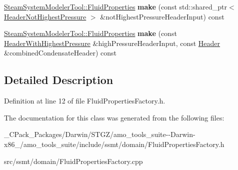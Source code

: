 \begin{DoxyCompactItemize}
\item 
\mbox{\label{class_fluid_properties_factory_a5eab55f93cb93ba11dc21b39c7ae20ef}} 
\hyperlink{struct_steam_system_modeler_tool_1_1_fluid_properties}{Steam\+System\+Modeler\+Tool\+::\+Fluid\+Properties} {\bfseries make} (const std\+::shared\+\_\+ptr$<$ \hyperlink{class_header_not_highest_pressure}{Header\+Not\+Highest\+Pressure} $>$ \&not\+Highest\+Pressure\+Header\+Input) const
\item 
\mbox{\label{class_fluid_properties_factory_a5abeba1ebc4f0c7f9d1eaf292b0e4abe}} 
\hyperlink{struct_steam_system_modeler_tool_1_1_fluid_properties}{Steam\+System\+Modeler\+Tool\+::\+Fluid\+Properties} {\bfseries make} (const \hyperlink{class_header_with_highest_pressure}{Header\+With\+Highest\+Pressure} \&high\+Pressure\+Header\+Input, const \hyperlink{class_header}{Header} \&combined\+Condensate\+Header) const
\end{DoxyCompactItemize}


\subsection{Detailed Description}


Definition at line 12 of file Fluid\+Properties\+Factory.\+h.



The documentation for this class was generated from the following files\+:\begin{DoxyCompactItemize}
\item 
\+\_\+\+C\+Pack\+\_\+\+Packages/\+Darwin/\+S\+T\+G\+Z/amo\+\_\+tools\+\_\+suite-\/-\/\+Darwin-\/x86\+\_/amo\+\_\+tools\+\_\+suite/include/ssmt/domain/Fluid\+Properties\+Factory.\+h\item 
src/ssmt/domain/Fluid\+Properties\+Factory.\+cpp\end{DoxyCompactItemize}
